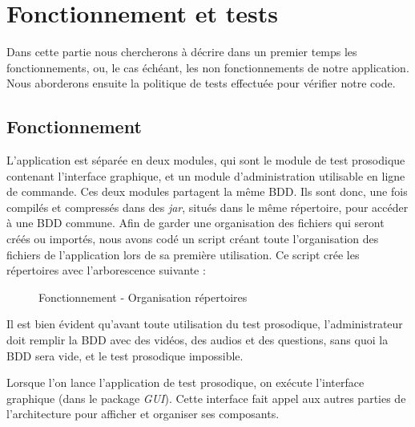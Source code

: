 \chapter{Fonctionnement et tests}

Dans cette partie nous chercherons à décrire dans un premier temps les fonctionnements, ou, le cas échéant, les non fonctionnements de notre application.  Nous aborderons ensuite la politique de tests effectuée pour vérifier notre code. 

\section{Fonctionnement}

L'application est séparée en deux modules, qui sont le module de test prosodique contenant l'interface graphique, et un module d'administration utilisable en ligne de commande. Ces deux modules partagent la même BDD. Ils sont donc, une fois compilés et compressés dans des \textit{jar}, situés dans le même répertoire, pour accéder à une BDD commune. Afin de garder une organisation des fichiers qui seront créés ou importés, nous avons codé un script créant toute l'organisation des fichiers de l'application lors de sa première utilisation. Ce script crée les répertoires avec l'arborescence suivante :

\begin{figure}[!ht]
\begin{center}
  \caption{Fonctionnement - Organisation répertoires}
  \label{tree} 
\end{center}
\end{figure}

Il est bien évident qu'avant toute utilisation du test prosodique, l'administrateur doit remplir la BDD avec des vidéos, des audios et des questions, sans quoi la BDD sera vide, et le test prosodique impossible.

Lorsque l'on lance l'application de test prosodique, on exécute l'interface graphique (dans le package \textit{GUI}). Cette interface fait appel aux autres parties de l'architecture pour afficher et organiser ses composants.

